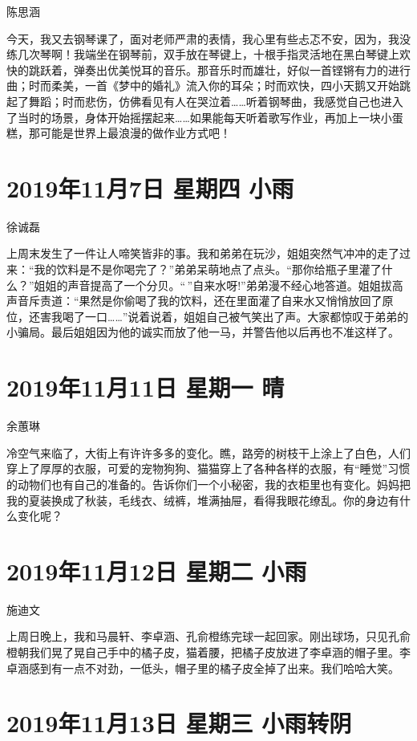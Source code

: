 陈思涵

今天，我又去钢琴课了，面对老师严肃的表情，我心里有些忐忑不安，因为，我没练几次琴啊！我端坐在钢琴前，双手放在琴键上，十根手指灵活地在黑白琴键上欢快的跳跃着，弹奏出优美悦耳的音乐。那音乐时而雄壮，好似一首铿锵有力的进行曲；时而柔美，一首《梦中的婚礼》流入你的耳朵；时而欢快，四小天鹅又开始跳起了舞蹈；时而悲伤，仿佛看见有人在哭泣着\ldots\ldots 听着钢琴曲，我感觉自己也进入了当时的场景，身体开始摇摆起来\ldots\ldots 如果能每天听着歌写作业，再加上一块小蛋糕，那可能是世界上最浪漫的做作业方式吧！

\section{2019年11月7日 星期四 小雨}

徐诚磊

上周末发生了一件让人啼笑皆非的事。我和弟弟在玩沙，姐姐突然气冲冲的走了过来：``我的饮料是不是你喝完了？''弟弟呆萌地点了点头。``那你给瓶子里灌了什么？''姐姐的声音提高了一个分贝。``\,''自来水呀!''弟弟漫不经心地答道。姐姐拔高声音斥责道：``果然是你偷喝了我的饮料，还在里面灌了自来水又悄悄放回了原位，还害我喝了一口\ldots\ldots{}''说着说着，姐姐自己被气笑出了声。大家都惊叹于弟弟的小骗局。最后姐姐因为他的诚实而放了他一马，并警告他以后再也不准这样了。

\section{2019年11月11日 星期一 晴}

余蕙琳

冷空气来临了，大街上有许许多多的变化。瞧，路旁的树枝干上涂上了白色，人们穿上了厚厚的衣服，可爱的宠物狗狗、猫猫穿上了各种各样的衣服，有``睡觉''习惯的动物们也有自己的准备的。告诉你们一个小秘密，我的衣柜里也有变化。妈妈把我的夏装换成了秋装，毛线衣、绒裤，堆满抽屉，看得我眼花缭乱。你的身边有什么变化呢？

\section{2019年11月12日 星期二 小雨}

施迪文

上周日晚上，我和马晨轩、李卓涵、孔俞橙练完球一起回家。刚出球场，只见孔俞橙朝我们晃了晃自己手中的橘子皮，猫着腰，把橘子皮放进了李卓涵的帽子里。李卓涵感到有一点不对劲，一低头，帽子里的橘子皮全掉了出来。我们哈哈大笑。

\section{2019年11月13日 星期三 小雨转阴}

